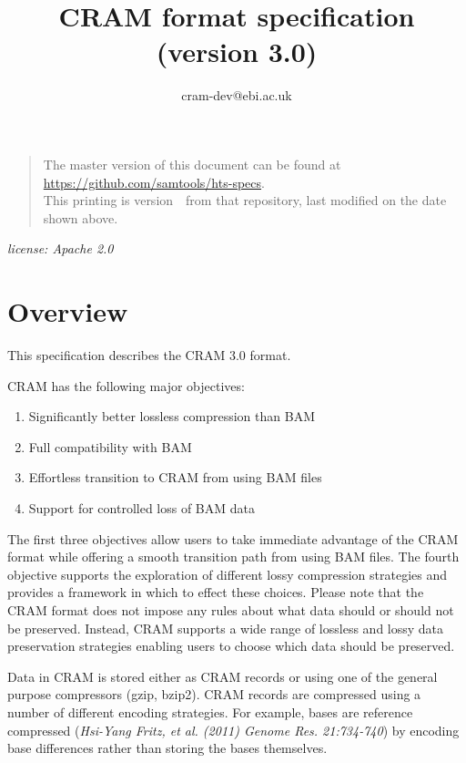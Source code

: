\documentclass[a4paper]{article}
\begin{document}

\title{CRAM format specification (version 3.0)}
\author{cram-dev@ebi.ac.uk}
\date{\headdate}


\begin{quote}\small
The master version of this document can be found at
\url{https://github.com/samtools/hts-specs}.\\
This printing is version~\commitdesc\ from that repository,
last modified on the date shown above.
\end{quote}

\begin{center}
\textit{license: Apache 2.0}
\end{center}
\vspace*{1em}

\section{\textbf{Overview}}

This specification describes the CRAM 3.0 format. 

CRAM has the following major objectives:

\begin{enumerate}
\item Significantly better lossless compression than BAM

\item Full compatibility with BAM

\item Effortless transition to CRAM from using BAM files

\item Support for controlled loss of BAM data
\end{enumerate}

The first three objectives allow users to take immediate advantage of the CRAM 
format while offering a smooth transition path from using BAM files. The fourth 
objective supports the exploration of different lossy compression strategies and 
provides a framework in which to effect these choices. Please note that the CRAM 
format does not impose any rules about what data should or should not be preserved. 
Instead, CRAM supports a wide range of lossless and lossy data preservation strategies 
enabling users to choose which data should be preserved.

Data in CRAM is stored either as CRAM records or using one of the general purpose 
compressors (gzip, bzip2). CRAM records are compressed using a number of different 
encoding strategies. For example, bases are reference compressed (\emph{Hsi-Yang 
Fritz, et al. (2011) Genome Res. 21:734-740}) by encoding base differences rather 
than storing the bases themselves.
\end{document}
